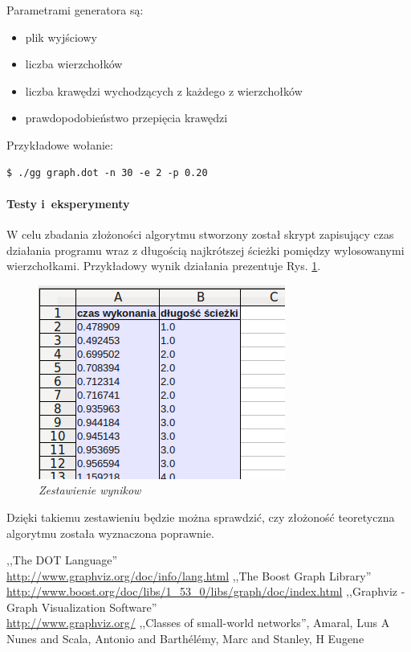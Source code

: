 \documentclass[a4paper, 12pt]{article}
\begin{document}
Parametrami generatora są:
\begin{itemize}
\item plik wyjściowy
\item liczba wierzchołków
\item liczba krawędzi wychodzących z każdego z wierzchołków 
\item prawdopodobieństwo przepięcia krawędzi
\end{itemize}

Przykładowe wołanie:
\begin{verbatim}
$ ./gg graph.dot -n 30 -e 2 -p 0.20
\end{verbatim}

\paragraph{Testy i~eksperymenty}
W celu zbadania złożoności algorytmu stworzony został skrypt zapisujący czas działania programu wraz  z długością najkrótszej ścieżki pomiędzy wylosowanymi wierzchołkami. Przykładowy wynik działania prezentuje Rys. \ref{fig:tabela}.

\begin{figure}[ht]
\centering
\includegraphics[scale=0.7]{tabela.png}
\caption{\em Zestawienie wynikow}
\label{fig:tabela}
\end{figure}
Dzięki takiemu zestawieniu będzie można sprawdzić, czy złożoność teoretyczna algorytmu została wyznaczona poprawnie.

\begin{thebibliography}{}
 ,,The DOT Language'' \\ \url{http://www.graphviz.org/doc/info/lang.html}
 ,,The Boost Graph Library'' \\ \url{http://www.boost.org/doc/libs/1_53_0/libs/graph/doc/index.html}
 ,,Graphviz - Graph Visualization Software'' \\ \url{http://www.graphviz.org/}
 ,,Classes of small-world networks'', Amaral, Lu{\i}s A Nunes and Scala, Antonio and Barth{\'e}l{\'e}my, Marc and Stanley, H Eugene
\end{thebibliography}
\end{document}
